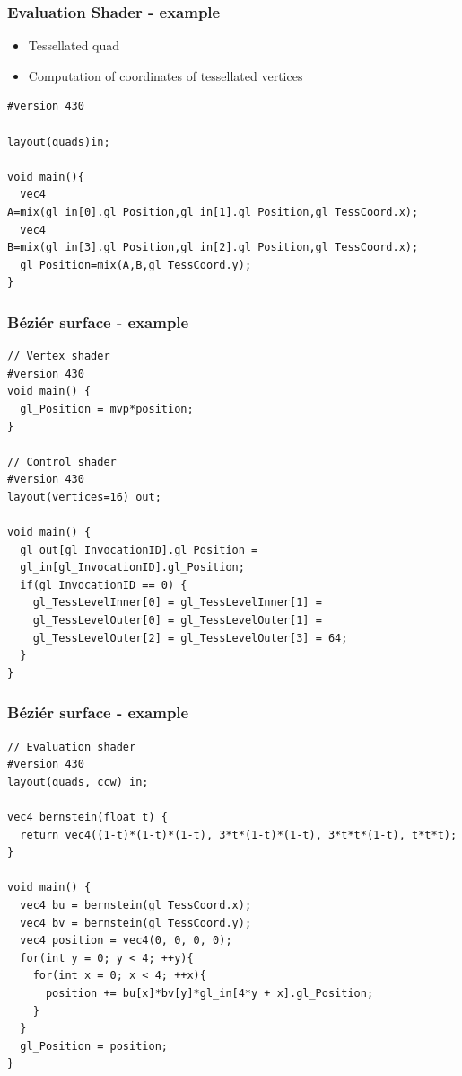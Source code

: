 \begin{frame}[fragile]
\frametitle{Evaluation Shader - example}
	\begin{itemize}
		\item Tessellated quad
		\item Computation of coordinates of tessellated vertices
	\end{itemize}
	{\scriptsize
\begin{verbatim}
#version 430

layout(quads)in;

void main(){
  vec4 A=mix(gl_in[0].gl_Position,gl_in[1].gl_Position,gl_TessCoord.x);
  vec4 B=mix(gl_in[3].gl_Position,gl_in[2].gl_Position,gl_TessCoord.x);
  gl_Position=mix(A,B,gl_TessCoord.y);
}
	\end{verbatim}
	}
\end{frame}


\begin{frame}[fragile]
\frametitle{Béziér surface - example}
{\scriptsize
\begin{verbatim}
// Vertex shader	
#version 430
void main() {
  gl_Position = mvp*position;
}

// Control shader
#version 430
layout(vertices=16) out;

void main() {
  gl_out[gl_InvocationID].gl_Position =
  gl_in[gl_InvocationID].gl_Position;
  if(gl_InvocationID == 0) {
    gl_TessLevelInner[0] = gl_TessLevelInner[1] = 
    gl_TessLevelOuter[0] = gl_TessLevelOuter[1] =
    gl_TessLevelOuter[2] = gl_TessLevelOuter[3] = 64;
  }
}
\end{verbatim}
}
\end{frame}

\begin{frame}[fragile]
  \frametitle{Béziér surface - example}
{\scriptsize
\begin{verbatim}
// Evaluation shader
#version 430
layout(quads, ccw) in;

vec4 bernstein(float t) {
  return vec4((1-t)*(1-t)*(1-t), 3*t*(1-t)*(1-t), 3*t*t*(1-t), t*t*t);
}

void main() {
  vec4 bu = bernstein(gl_TessCoord.x);
  vec4 bv = bernstein(gl_TessCoord.y);
  vec4 position = vec4(0, 0, 0, 0);
  for(int y = 0; y < 4; ++y){
    for(int x = 0; x < 4; ++x){
      position += bu[x]*bv[y]*gl_in[4*y + x].gl_Position;
    }
  }
  gl_Position = position;
}
\end{verbatim}
}
\end{frame}

